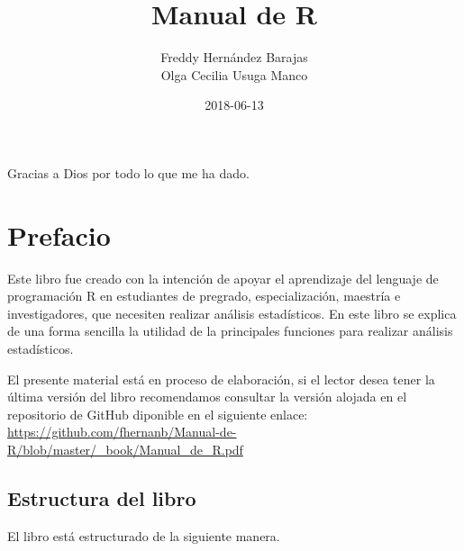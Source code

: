 \documentclass[10pt,]{krantz}
\title{Manual de R}
\author{Freddy Hernández Barajas\\
Olga Cecilia Usuga Manco}
\date{2018-06-13}
\let\proglang=\textsf
\begin{document}
\maketitle


\thispagestyle{empty}

\begin{center}

Gracias a Dios por todo lo que me ha dado.

\end{center}

\setlength{\abovedisplayskip}{-5pt}
\setlength{\abovedisplayshortskip}{-5pt}

{
\hypersetup{linkcolor=black}
\setcounter{tocdepth}{2}
\tableofcontents
}
\listoftables
\listoffigures
\chapter*{Prefacio}\label{prefacio}


Este libro fue creado con la intención de apoyar el aprendizaje del
lenguaje de programación \proglang{R} en estudiantes de pregrado,
especialización, maestría e investigadores, que necesiten realizar
análisis estadísticos. En este libro se explica de una forma sencilla la
utilidad de la principales funciones para realizar análisis
estadísticos.

El presente material está en proceso de elaboración, si el lector desea
tener la última versión del libro recomendamos consultar la versión
alojada en el repositorio de GitHub diponible en el siguiente enlace:
\url{https://github.com/fhernanb/Manual-de-R/blob/master/_book/Manual_de_R.pdf}

\section*{Estructura del libro}\label{estructura-del-libro}


El libro está estructurado de la siguiente manera.
\end{document}
